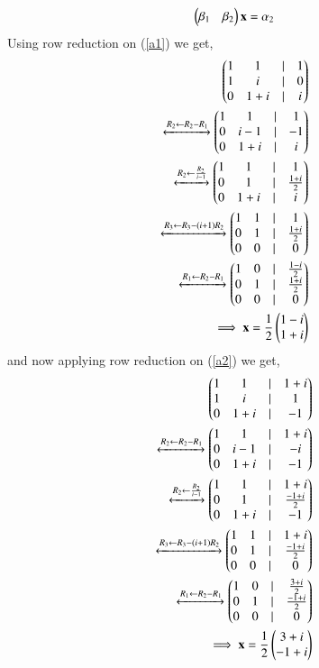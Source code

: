 \documentclass[journal,12pt,twocolumn]{IEEEtran}
\begin{document}
\begin{enumerate}[label=\emph{\alph*)}]
\begin{align}
		\myvec{\beta_1 & \beta_2}\vec{x}=\alpha_2 \label{a2}
	\end{align}
Using row reduction on (\ref{a1}) we get,
\begin{align}
	\begin{pmatrix}1 & 1 & | & 1 \\
	       1 & i & | & 0 \\
	       0 & 1+i &| & i\end{pmatrix}\\
	\xleftrightarrow[]{R_2 \leftarrow R_2-R_1}
	\begin{pmatrix}1 & 1 & | & 1 \\
               0 & i-1 & | & -1 \\
               0 & 1+i &| & i\end{pmatrix}\\
        \xleftrightarrow[]{R_2 \leftarrow \frac{R_2}{i-1}}
	\begin{pmatrix}1 & 1 & | & 1 \\
	       0 & 1 & | & \frac{1+i}{2} \\
               0 & 1+i &| & i\end{pmatrix}\\
	\xleftrightarrow[]{R_3 \leftarrow R_3 - (i+1)R_2}
	\begin{pmatrix}1 & 1 & | & 1 \\
               0 & 1 & | & \frac{1+i}{2} \\
               0 & 0 &| & 0\end{pmatrix}\\
	\xleftrightarrow[]{R_1 \leftarrow R_2- R_1}
	\begin{pmatrix}1 & 0 & | & \frac{1-i}{2} \\
               0 & 1 & | & \frac{1+i}{2} \\
               0 & 0 &| & 0\end{pmatrix}\\
	\implies 
	\mathbf{x}=\frac{1}{2}\begin{pmatrix}1-i \\ 1+i\end{pmatrix}
\end{align}
and now applying row reduction on (\ref{a2}) we get,
\begin{align}
        \begin{pmatrix}1 & 1 & | & 1+i \\
	       1 & i & | & 1 \\
               0 & 1+i &| & -1\end{pmatrix}\\
        \xleftrightarrow[]{R_2 \leftarrow R_2-R_1}
        \begin{pmatrix}1 & 1 & | & 1+i \\
               0 & i-1 & | & -i \\
               0 & 1+i &| & -1\end{pmatrix}\\
        \xleftrightarrow[]{R_2 \leftarrow \frac{R_2}{i-1}}
        \begin{pmatrix}1 & 1 & | & 1+i \\
               0 & 1 & | & \frac{-1+i}{2} \\
               0 & 1+i &| & -1\end{pmatrix}\\
        \xleftrightarrow[]{R_3 \leftarrow R_3 - (i+1)R_2}
        \begin{pmatrix}1 & 1 & | & 1+i \\
               0 & 1 & | & \frac{-1+i}{2} \\
               0 & 0 &| & 0\end{pmatrix}\\
        \xleftrightarrow[]{R_1 \leftarrow R_2-R_1}
        \begin{pmatrix}1 & 0 & | & \frac{3+i}{2} \\
               0 & 1 & | & \frac{-1+i}{2} \\
               0 & 0 &| & 0\end{pmatrix}\\
        \implies
        \mathbf{x}=\frac{1}{2}\begin{pmatrix}3+i \\ -1+i\end{pmatrix}
\end{align}
\end{enumerate}
\end{document}
